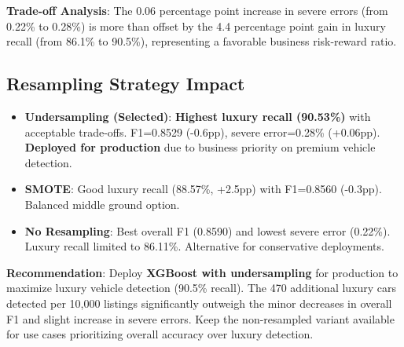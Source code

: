 \documentclass[12pt, a4paper]{article}
\begin{document}
\textbf{Trade-off Analysis}: The 0.06 percentage point increase in severe errors (from 0.22\% to 0.28\%) is more than offset by the 4.4 percentage point gain in luxury recall (from 86.1\% to 90.5\%), representing a favorable business risk-reward ratio.

\subsection{Resampling Strategy Impact}
\begin{itemize}
    \item \textbf{Undersampling (Selected)}: \textbf{Highest luxury recall (90.53\%)} with acceptable trade-offs. F1=0.8529 (-0.6pp), severe error=0.28\% (+0.06pp). \textbf{Deployed for production} due to business priority on premium vehicle detection.
    \item \textbf{SMOTE}: Good luxury recall (88.57\%, +2.5pp) with F1=0.8560 (-0.3pp). Balanced middle ground option.
    \item \textbf{No Resampling}: Best overall F1 (0.8590) and lowest severe error (0.22\%). Luxury recall limited to 86.11\%. Alternative for conservative deployments.
\end{itemize}

\textbf{Recommendation}: Deploy \textbf{XGBoost with undersampling} for production to maximize luxury vehicle detection (90.5\% recall). The 470 additional luxury cars detected per 10,000 listings significantly outweigh the minor decreases in overall F1 and slight increase in severe errors. Keep the non-resampled variant available for use cases prioritizing overall accuracy over luxury detection.

\newpage
\end{document}
